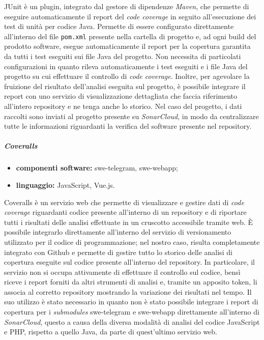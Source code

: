 				JUnit è un plugin, integrato dal gestore di dipendenze \textit{Maven}, che permette di eseguire automaticamente il report del \textit{code coverage} in seguito all'esecuzione dei test di unità per codice Java.
				\newline
				Permette di essere configurato direttamente all'interno del file \verb!pom.xml! presente nella cartella di progetto e, ad ogni build del prodotto software, esegue automaticamente il report per la copertura garantita da tutti i test eseguiti sui file Java del progetto.
				\newline
				Non necessita di particolati configurazioni in quanto rileva automaticamente i test eseguiti e i file Java del progetto su cui effettuare il controllo di \textit{code coverage}.
				\newline
				Inoltre, per agevolare la fruizione del risultato dell'analisi eseguita sul progetto, è possibile integrare il report con uno servizio di visualizzazione dettagliata che faccia riferimento all'intero repository e ne tenga anche lo storico. Nel caso del progetto, i dati raccolti sono inviati al progetto presente su \textit{SonarCloud}, in modo da centralizzare tutte le informazioni riguardanti la verifica del software presente nel repository.
				
			\subparagraph{Coveralls}
			
				\begin{itemize}
					\item \textbf{componenti software:} swe-telegram, swe-webapp;
					\item \textbf{linguaggio:} JavaScript, Vue.js.
				\end{itemize}
				
				Coveralls è un servizio web che permette di visualizzare e gestire dati di \textit{code coverage} riguardanti codice presente all'interno di un repository e di riportare tutti i risultati delle analisi effettuate in un cruscotto accessibile tramite web.
				\newline
				È possibile integrarlo direttamente all'interno del servizio di versionamento utilizzato per il codice di programmazione; nel nostro caso, risulta completamente integrato con Github e permette di gestire tutto lo storico delle analisi di copertura eseguite sul codice presente all'interno del repository.
				\newline
				In particolare, il servizio non si occupa attivamente di effettuare il controllo sul codice, bensì riceve i report forniti da altri strumenti di analisi e, tramite un apposito token, li associa al corretto repository mostrando la variazione dei risultati nel tempo.
				\newline
				Il suo utilizzo è stato necessario in quanto non è stato possibile integrare i report di copertura per i \textit{submodules} swe-telegram e swe-webapp direttamente all'interno di \textit{SonarCloud}, questo a causa della diversa modalità di analisi del codice JavaScript e PHP, rispetto a quello Java, da parte di quest'ultimo servizio web.
				
			